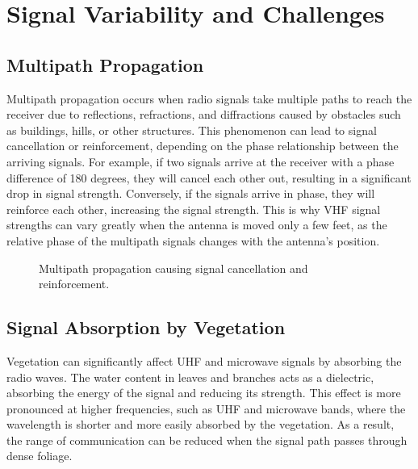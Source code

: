 \section{Signal Variability and Challenges}
\label{section:signal_variability}

\subsection*{Multipath Propagation}
Multipath propagation occurs when radio signals take multiple paths to reach the receiver due to reflections, refractions, and diffractions caused by obstacles such as buildings, hills, or other structures. This phenomenon can lead to signal cancellation or reinforcement, depending on the phase relationship between the arriving signals. For example, if two signals arrive at the receiver with a phase difference of 180 degrees, they will cancel each other out, resulting in a significant drop in signal strength. Conversely, if the signals arrive in phase, they will reinforce each other, increasing the signal strength. This is why VHF signal strengths can vary greatly when the antenna is moved only a few feet, as the relative phase of the multipath signals changes with the antenna's position.

\begin{figure}[h!]
    \centering
    \caption{Multipath propagation causing signal cancellation and reinforcement.}
    \label{fig:multipath_propagation}
\end{figure}

\subsection*{Signal Absorption by Vegetation}
Vegetation can significantly affect UHF and microwave signals by absorbing the radio waves. The water content in leaves and branches acts as a dielectric, absorbing the energy of the signal and reducing its strength. This effect is more pronounced at higher frequencies, such as UHF and microwave bands, where the wavelength is shorter and more easily absorbed by the vegetation. As a result, the range of communication can be reduced when the signal path passes through dense foliage.


